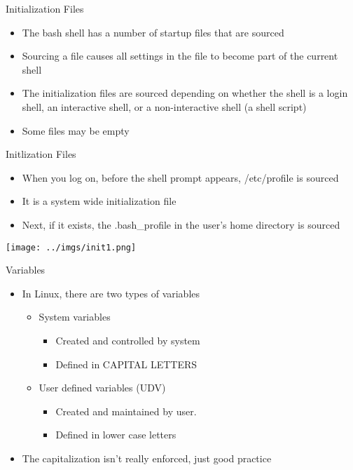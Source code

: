 \documentclass{beamer}
\begin{document}
\begin{frame}{Initialization Files}
\begin{itemize}
\item The bash shell has a number of startup files that are sourced
\item Sourcing a file causes all settings in the file to become part of the current shell 
\item The initialization files are sourced depending on whether the shell is a login shell, an interactive shell, or a non-interactive shell (a shell script)
\item Some files may be empty
\end{itemize}
\end{frame}

\begin{frame}{Initlization Files}
\begin{itemize}
\item When you log on, before the shell prompt appears, /etc/profile is sourced 
\item It is a system wide initialization file
\item Next, if it exists, the .bash\_profile in the user's home directory is sourced
\end{itemize}
\texttt{[image: ../imgs/init1.png]}
\end{frame}

\begin{frame}{Variables}
\begin{itemize}
\item In Linux, there are two types of variables
\begin{itemize}
\item System variables
\begin{itemize}
\item Created and controlled by system
\item Defined in CAPITAL LETTERS
\end{itemize}
\item User defined variables (UDV)
\begin{itemize}
\item Created and maintained by user.
\item Defined in lower case letters
\end{itemize}
\end{itemize}
\item The capitalization isn't really enforced, just good practice
\end{itemize}
\end{frame}
\end{document}
